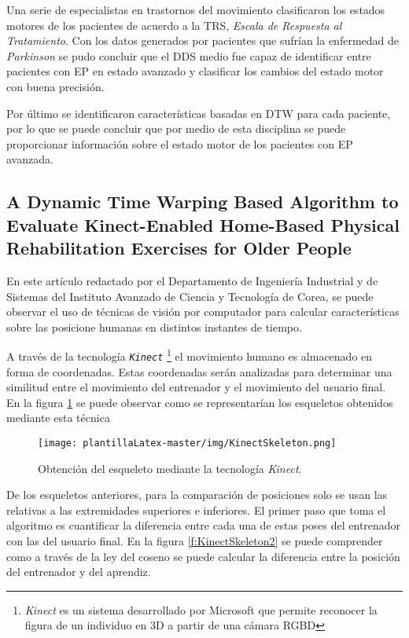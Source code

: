 Una serie de especialistas en trastornos del movimiento clasificaron los estados motores de los pacientes de acuerdo a la TRS, \textit{Escala de Respuesta al Tratamiento}. Con los datos generados por pacientes que sufrían la enfermedad de \textit{Parkinson} se pudo concluir que el DDS medio fue capaz de identificar entre pacientes con EP en estado avanzado y clasificar los cambios del estado motor con buena precisión. 

Por último se identificaron características basadas en DTW para cada paciente, por lo que se puede concluir que por medio de esta disciplina se puede proporcionar información sobre el estado motor de los pacientes con EP avanzada. 


\subsection{A Dynamic Time Warping Based Algorithm to Evaluate Kinect-Enabled Home-Based Physical Rehabilitation Exercises for Older People ~\cite{s19132882}} \label{cap:TrabRelTaiChi}

En este artículo redactado por el Departamento de Ingeniería Industrial y de Sistemas del  Instituto Avanzado de Ciencia y Tecnología de Corea, se puede observar el uso de técnicas de visión por computador para calcular características sobre las posicione humanas en distintos instantes de tiempo. 

A través de la tecnología \texttt{\textit{Kinect}} \footnote{\textit{Kinect} es un sistema desarrollado por Microsoft que permite reconocer la figura de un individuo en 3D a partir de una cámara RGBD} el movimiento humano es almacenado en forma de coordenadas. Estas coordenadas serán analizadas para determinar una similitud entre el movimiento del entrenador y el movimiento del usuario final. En la figura \ref{f:KinectSkeleton} se puede observar como se representarían los esqueletos obtenidos mediante esta técnica


\begin{figure}
 \centering
    \texttt{[image: plantillaLatex-master/img/KinectSkeleton.png]}
    \caption{Obtención del esqueleto mediante la tecnología \textit{Kinect}.}
    \label{f:KinectSkeleton}
\end{figure}


De los esqueletos anteriores, para la comparación de posiciones solo se usan las relativas a las extremidades superiores e inferiores. El primer paso que toma el algoritmo es cuantificar la diferencia entre cada una de estas poses del entrenador con las del usuario final. En la figura \ref{f:KinectSkeleton2} se puede comprender como a través de la ley del coseno se puede calcular la diferencia entre la posición del entrenador y del aprendiz. 

